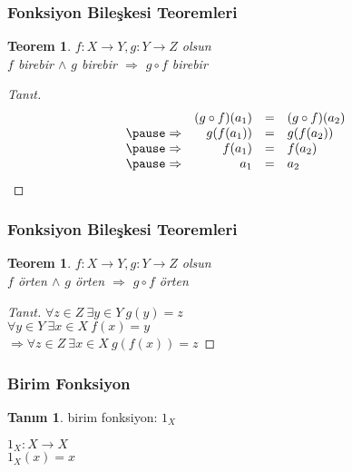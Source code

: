 \documentclass[dvipsnames]{beamer}
\theoremstyle{definition}
\newtheorem{tanim}[theorem]{Tanım}
\theoremstyle{example}
\theoremstyle{plain}
\newtheorem{teorem}[theorem]{Teorem}
\begin{document}
\begin{frame}
  \frametitle{Fonksiyon Bileşkesi Teoremleri}

  \begin{teorem}
    $f: X \rightarrow Y, g: Y \rightarrow Z$ olsun\\
    $f$ birebir $\wedge$ $g$ birebir $\Rightarrow$ $g \circ f$ birebir
  \end{teorem}

  \pause
  \begin{proof}[Tanıt]
    \[
      \begin{array}{crcl}
                  & (g \circ f) (a_1) & = & (g \circ f) (a_2)\\\pause
      \Rightarrow & g(f(a_1))         & = & g(f(a_2))\\\pause
      \Rightarrow & f(a_1)            & = & f(a_2)\\\pause
      \Rightarrow & a_1               & = & a_2
      \end{array}
    \]
  \end{proof}
\end{frame}

\begin{frame}
  \frametitle{Fonksiyon Bileşkesi Teoremleri}

  \begin{teorem}
    $f: X \rightarrow Y, g: Y \rightarrow Z$ olsun\\
    $f$ örten $\wedge$ $g$ örten $\Rightarrow$ $g \circ f$ örten
  \end{teorem}

  \pause
  \begin{proof}[Tanıt]
    $\forall z \in Z~\exists y \in Y~g(y) = z$\\\pause
    $\forall y \in Y~\exists x \in X~f(x) = y$\\\pause
      $\Rightarrow \forall z \in Z~\exists x \in X~g(f(x)) = z$
  \end{proof}
\end{frame}

\begin{frame}
  \frametitle{Birim Fonksiyon}

  \begin{tanim}
    \alert{birim fonksiyon}: $1_X$

    \medskip
    $1_X: X \rightarrow X$\\
    $1_X(x) = x$
  \end{tanim}
\end{frame}
\end{document}
